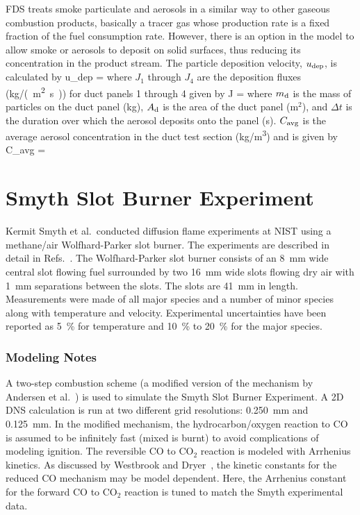 FDS treats smoke particulate and aerosols in a similar way to other gaseous combustion products, basically a tracer gas whose production rate is a fixed fraction of the fuel consumption rate. However, there is an option in the model to allow smoke or aerosols to deposit on solid surfaces, thus reducing its concentration in the product stream. The particle deposition velocity, $u_{\rm dep}$, is calculated by
\be
   u_{\rm dep} = 
\ee
where $J_1$ through $J_4$ are the deposition fluxes (\unit{kg/(m^2.s)}) for duct panels 1 through 4 given by
\be
   J = 
\ee
where $m_{\rm d}$ is the mass of particles on the duct panel (kg), $A_{\rm d}$ is the area of the duct panel (m$^2$), and $\Delta t$ is the duration over which the aerosol deposits onto the panel (s). $C_{\rm avg}$ is the
average aerosol concentration in the duct test section (\unit{kg/m^3}) and is given by
\be
   C_{\rm avg} = 
\ee

\section{Smyth Slot Burner Experiment}
\label{Smyth_Slot_Burner_Description}

Kermit Smyth et al.~conducted diffusion flame experiments at NIST using a methane/air Wolfhard-Parker slot burner. The experiments are described in detail in Refs.~\cite{Norton:1,Smyth:1}. The Wolfhard-Parker slot burner consists of an 8~mm wide central slot flowing fuel surrounded by two 16~mm wide slots flowing dry air with 1~mm separations between the slots. The slots are 41~mm in length. Measurements were made of all major species and a number of minor species along with temperature and velocity. Experimental uncertainties have been reported as 5~\% for temperature  and 10~\% to 20~\% for the major species.

\subsubsection{Modeling Notes}

A two-step combustion scheme (a modified version of the mechanism by Andersen et al.~\cite{AndersenJ:1}) is used to simulate the Smyth Slot Burner Experiment.  A 2D DNS calculation is run at two different grid resolutions: 0.250~mm and 0.125~mm.  In the modified mechanism, the hydrocarbon/oxygen reaction to CO is assumed to be infinitely fast (mixed is burnt) to avoid complications of modeling ignition.  The reversible CO to CO$_2$ reaction is modeled with Arrhenius kinetics.  As discussed by Westbrook and Dryer~\cite{Westbrook:1}, the kinetic constants for the reduced CO mechanism may be model dependent.  Here, the Arrhenius constant for the forward CO to CO$_2$ reaction is tuned to match the Smyth experimental data.

